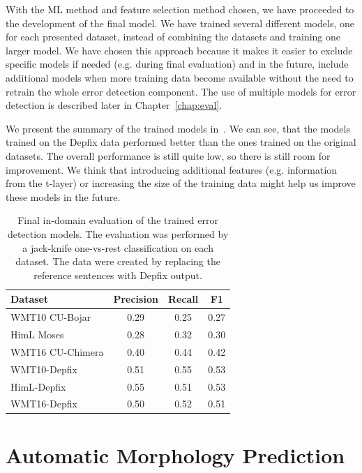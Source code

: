 With the ML method and feature selection method chosen, we have proceeded to 
the development of the final model.
We have trained several different models, one for each presented dataset, instead of combining
the datasets and training one larger model. We have chosen this approach because it makes
it easier to exclude specific models if needed (e.g. during final evaluation) and in the
future, include additional models when more training data become available without the need
to retrain the whole error detection component. The use of multiple models for error detection
is described later in Chapter~\ref{chap:eval}.

We present the summary of the trained models in~. We can see, that the models
trained on the Depfix data performed better than the ones trained on the original datasets. The overall
performance is still quite low, so there is still room for improvement. We think that introducing
additional features (e.g. information from the t-layer) or increasing the size of the training data
might help us improve these models in the future.

\begin{table}[t]
\centering
\small

\begin{tabular}{l|ccc}
Dataset  &  Precision  &  Recall  &  F1  \\
\hline
WMT10 CU-Bojar  &  0.29  &  0.25  &  0.27  \\
HimL Moses  &  0.28  &  0.32  &  0.30  \\
WMT16 CU-Chimera  &  0.40  &  0.44  &  0.42  \\
WMT10-Depfix  &  0.51  &  0.55  &  0.53  \\
HimL-Depfix  &  0.55  &  0.51  &  0.53  \\
WMT16-Depfix  &  0.50  &  0.52  &  0.51  \\
\end{tabular}
\caption{
    Final in-domain evaluation of the trained error detection models. The evaluation was performed
by a jack-knife one-vs-rest classification on each dataset. The  data were created
by replacing the reference sentences with Depfix output.
}
\label{wf-summary}
\end{table}


\section{Automatic Morphology Prediction}

